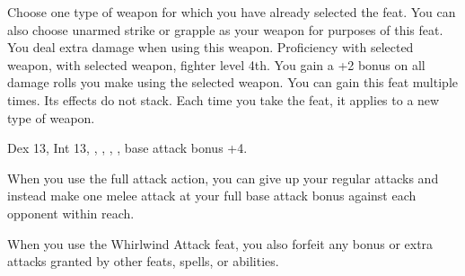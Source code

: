 {Choose one type of weapon for which you have already selected the  feat. You can also choose unarmed strike or grapple as your weapon for purposes of this feat. You deal extra damage when using this weapon.}
{Proficiency with selected weapon,  with selected weapon, fighter level 4th.}
{You gain a +2 bonus on all damage rolls you make using the selected weapon.}{}
{You can gain this feat multiple times. Its effects do not stack. Each time you take the feat, it applies to a new type of weapon.}

{Dex 13, Int 13, , , , , base attack bonus +4.}
{When you use the full attack action, you can give up your regular attacks and instead make one melee attack at your full base attack bonus against each opponent within reach.

When you use the Whirlwind Attack feat, you also forfeit any bonus or extra attacks granted by other feats, spells, or abilities.}
